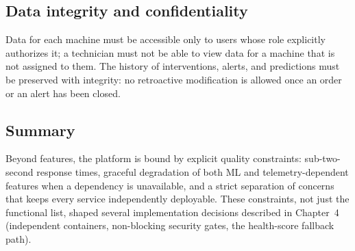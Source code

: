 \subsection{Data integrity and confidentiality}

Data for each machine must be accessible only to users whose role explicitly authorizes it; a technician must not be able to view data for a machine that is not assigned to them.
The history of interventions, alerts, and predictions must be preserved with integrity: no retroactive modification is allowed once an order or an alert has been closed.

\subsection{Summary}

Beyond features, the platform is bound by explicit quality constraints: sub-two-second response times, graceful degradation of both ML and telemetry-dependent features when a dependency is unavailable, and a strict separation of concerns that keeps every service independently deployable. These constraints, not just the functional list, shaped several implementation decisions described in Chapter~4 (independent containers, non-blocking security gates, the health-score fallback path).
